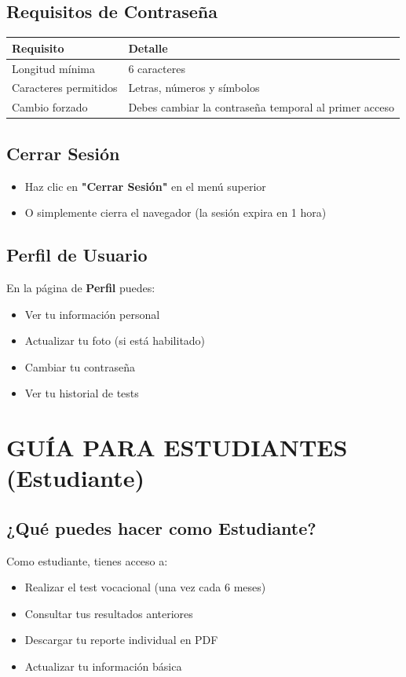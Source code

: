 \documentclass[12pt, a4paper]{report}
\newcommand{\rolestudent}{\textcolor{successgreen}{\textbf{Estudiante}}}
\begin{document}
\section{Requisitos de Contraseña}
\begin{table}[htbp]
\centering
\begin{tabularx}{\textwidth}{|l|X|}
\hline
\textbf{Requisito} & \textbf{Detalle} \\
\hline
Longitud mínima & 6 caracteres \\
Caracteres permitidos & Letras, números y símbolos \\
Cambio forzado & Debes cambiar la contraseña temporal al primer acceso \\
\hline
\end{tabularx}
\end{table}

\section{Cerrar Sesión}
\begin{itemize}
    \item Haz clic en \textbf{"Cerrar Sesión"} en el menú superior
    \item O simplemente cierra el navegador (la sesión expira en 1 hora)
\end{itemize}

\section{Perfil de Usuario}
En la página de \textbf{Perfil} puedes:
\begin{itemize}
    \item Ver tu información personal
    \item Actualizar tu foto (si está habilitado)
    \item Cambiar tu contraseña
    \item Ver tu historial de tests
\end{itemize}

\chapter{GUÍA PARA ESTUDIANTES (\rolestudent)}

\section{¿Qué puedes hacer como Estudiante?}
Como estudiante, tienes acceso a:
\begin{itemize}
    \item Realizar el test vocacional (una vez cada 6 meses)
    \item Consultar tus resultados anteriores
    \item Descargar tu reporte individual en PDF
    \item Actualizar tu información básica
\end{itemize}
\end{document}
